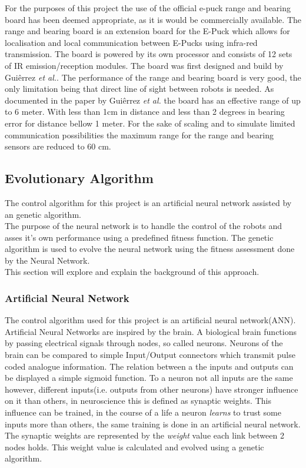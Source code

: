 For the purposes of this project the use of the official e-puck range and bearing board has been deemed appropriate, as it is would be commercially available.
The range and bearing board is an extension board for the E-Puck which allows for localisation and local communication between E-Pucks using infra-red transmission. 
The board is powered by its own processor and consists of 12 sets of IR emission/reception modules. 
The board was first designed and build by Guiêrrez \textit{et al.}\cite{Gutierrez}. 
The performance of the range and bearing board is very good, the only limitation being that direct line of sight between robots is needed. As documented in the paper by Guiêrrez \textit{et al.} the board has an effective range of up to 6 meter. With less than 1cm in distance and less than 2 degrees in bearing error for distance bellow 1 meter. 
For the sake of scaling and to simulate limited communication possibilities the maximum range for the range and bearing sensors are reduced to 60 cm.
 
\subsection{Evolutionary Algorithm}
The control algorithm for this project is an artificial neural network assisted by an genetic algorithm.\\
The purpose of the neural network is to handle the control of the robots and asses it's own performance using a predefined fitness function. 
The genetic algorithm is used to evolve the neural network using the fitness assessment done by the Neural Network. \\
This section will explore and explain the background of this approach.

\subsubsection{Artificial Neural Network}
The control algorithm used for this project is an artificial neural network(ANN).
Artificial Neural Networks are inspired by the brain. 
A biological brain functions by passing electrical signals through nodes, so called neurons. Neurons of the brain can be compared to simple Input/Output connectors which transmit pulse coded analogue information. The relation between a the inputs and outputs can be displayed a simple sigmoid function\cite{Hopfield}.
To a neuron not all inputs are the same however, different inputs(i.e. outputs from other neurons) have stronger influence on it than others, in neuroscience this is defined as synaptic weights. 
This influence can be trained, in the course of a life a neuron \textit{learns} to trust some inputs more than others, the same training is done in an artificial neural network. The synaptic weights are represented by the \textit{weight} value each link between 2 nodes holds. This weight value is calculated and evolved using a genetic algorithm. \\

